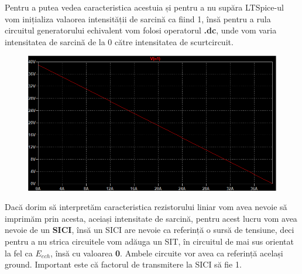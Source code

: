 \documentclass[12pt, a4paper]{article}
\begin{document}
Pentru a putea vedea caracteristica acestuia și pentru a nu supăra LTSpice-ul vom inițializa valaorea intensității de sarcină ca fiind 1, însă pentru a rula circuitul generatorului echivalent vom folosi operatorul \textbf{.dc}, unde vom varia intensitatea de sarcină de la 0 către intensitatea de scurtcircuit.

\begin{figure}[h]
    \centering
    \includegraphics[width=\linewidth, height=\textheight, keepaspectratio]{Caracteristica_generator.png}
    \label{fig:gener}
\end{figure}

Dacă dorim să interpretăm caracteristica rezistorului liniar vom avea nevoie să imprimăm prin acesta, aceiași intensitate de sarcină, pentru acest lucru vom avea nevoie de un \textbf{SICI}, însă un SICI are nevoie ca referință o sursă de tensiune, deci pentru a nu strica circuitele vom adăuga un SIT, în circuitul de mai sus orientat la fel ca $E_{ech}$, însă cu valoarea \textbf{0}. Ambele circuite vor avea ca referință același ground. Important este că factorul de transmitere la SICI să fie 1.
\end{document}
